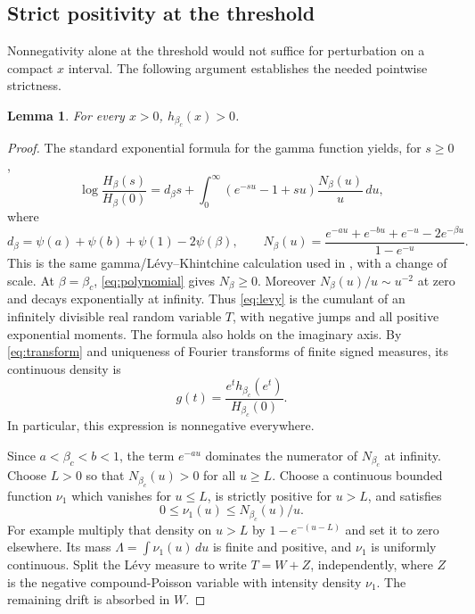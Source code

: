 \documentclass[11pt]{article}
\newtheorem{lemma}[theorem]{Lemma}
\begin{document}
\subsection*{Strict positivity at the threshold}
Nonnegativity alone at the threshold would not suffice for perturbation
on a compact $x$ interval. The following argument establishes the needed
pointwise strictness.

\begin{lemma}\label{lem:strict}
For every $x>0$, $h_{\beta_c}(x)>0$.
\end{lemma}
\begin{proof}
The standard exponential formula for the gamma function yields, for $s\geq0$,
\begin{equation}\label{eq:levy}
 \log\frac{H_\beta(s)}{H_\beta(0)}
 =d_\beta s+\int_0^\infty(e^{-su}-1+su)\frac{N_\beta(u)}u\,du,
\end{equation}
where
\[
 d_\beta=\psi(a)+\psi(b)+\psi(1)-2\psi(\beta),\qquad
 N_\beta(u)=\frac{e^{-au}+e^{-bu}+e^{-u}-2e^{-\beta u}}{1-e^{-u}}.
\]
This is the same gamma/L\'evy--Khintchine calculation used in
\cite[Section 2]{source}, with a change of scale.
At $\beta=\beta_c$, \eqref{eq:polynomial} gives $N_\beta\geq0$.
Moreover $N_\beta(u)/u\sim u^{-2}$ at zero and decays exponentially at
infinity. Thus \eqref{eq:levy} is the cumulant of an infinitely divisible
real random variable $T$, with negative jumps and all positive
exponential moments. The formula also holds on the imaginary axis.
By \eqref{eq:transform} and uniqueness of Fourier transforms of finite
signed measures, its continuous density is
\begin{equation}\label{eq:logdensity}
 g(t)=\frac{e^t h_{\beta_c}(e^t)}{H_{\beta_c}(0)}.
\end{equation}
In particular, this expression is nonnegative everywhere.

Since $a<\beta_c<b<1$, the term $e^{-au}$ dominates the numerator of
$N_{\beta_c}$ at infinity. Choose $L>0$ so that $N_{\beta_c}(u)>0$
for all $u\geq L$. Choose a continuous bounded function $\nu_1$ which
vanishes for $u\leq L$, is strictly positive for $u>L$, and satisfies
\[
 0\leq\nu_1(u)\leq N_{\beta_c}(u)/u.
\]
For example multiply that density on $u>L$ by
$1-e^{-(u-L)}$ and set it to zero elsewhere. Its mass
$\Lambda=\int\nu_1(u)\,du$ is finite and positive, and $\nu_1$ is
uniformly continuous.
Split the L\'evy measure to write $T=W+Z$, independently, where $Z$ is
the negative compound-Poisson variable with intensity density $\nu_1$.
The remaining drift is absorbed in $W$.


\end{proof}
\end{document}

